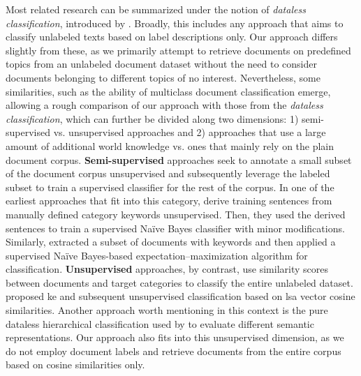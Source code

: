 \documentclass[a4paper,twoside]{article}
\begin{document}
Most related research can be summarized under the notion of \textit{dataless classification}, introduced by \citet{Chang2008ImportanceOS}. Broadly, this includes any approach that aims to classify unlabeled texts based on label descriptions only. Our approach differs slightly from these, as we primarily attempt to retrieve documents on predefined topics from an unlabeled document dataset without the need to consider documents belonging to different topics of no interest. Nevertheless, some similarities, such as the ability of multiclass document classification emerge, allowing a rough comparison of our approach with those from the \textit{dataless classification}, which can further be divided along two dimensions: 1) semi-supervised vs. unsupervised approaches and 2) approaches that use a large amount of additional world knowledge vs. ones that mainly rely on the plain document corpus. \newline
\newline \textbf{Semi-supervised} approaches seek to annotate a small subset of the document corpus unsupervised and subsequently leverage the labeled subset to train a supervised classifier for the rest of the corpus. In one of the earliest approaches that fit into this category, \citet{ko-seo-2000} derive training sentences from manually defined category keywords unsupervised. Then, they used the derived sentences to train a supervised Na\"ive Bayes classifier with minor modifications. Similarly, \citet{liu2004} extracted a subset of documents with keywords and then applied a supervised Na\"ive Bayes-based expectation–maximization algorithm \citep{dempster1977} for classification. \newline
\newline \textbf{Unsupervised} approaches, by contrast, use similarity scores between documents and target categories to classify the entire unlabeled dataset. \citet{haj-yahia-etal-2019-towards} proposed \ac{ke} and subsequent unsupervised classification based on \ac{lsa} \citep{Deerwester1990IndexingBL} vector cosine similarities. Another approach worth mentioning in this context is the pure dataless hierarchical classification used by \citet{Song_Roth_2014} to evaluate different semantic representations. Our approach also fits into this unsupervised dimension, as we do not employ document labels and retrieve documents from the entire corpus based on cosine similarities only. \newline
\end{document}
